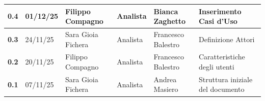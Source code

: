 \documentclass[a4paper,12pt]{article}
\begin{document}
{\begin{table}[h!]
\begin{tabularx}{\textwidth}{|l|l|l|l|L|L|}
                \hline
                \textbf{0.4} & 01/12/25 & Filippo Compagno & Analista & Bianca Zaghetto & Inserimento Casi d'Uso \\
                \hline
                \textbf{0.3} & 24/11/25 & Sara Gioia Fichera & Analista & Francesco Balestro &  Definizione Attori \\
                \hline
                \textbf{0.2} & 20/11/25 & Filippo Compagno & Analista & Francesco Balestro & Caratteristiche degli utenti \\
                \hline
                \textbf{0.1} & 07/11/25 & Sara Gioia Fichera & Analista & Andrea Masiero & Struttura iniziale del documento \\
                \hline
            \end{tabularx}
        \end{table}
    }
    \newpage
    
    \tableofcontents
    \newpage

    \listoffigures
    \newpage
    
    \listoftables
    \newpage
\end{document}
